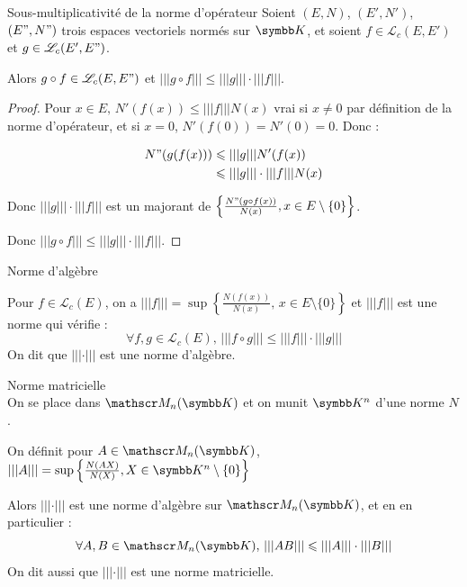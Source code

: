 \begin{proposition}{Sous-multiplicativité de la norme d'opérateur}{}
    Soient $(E, N)$, $(E', N')$, $(E", N")$ trois espaces vectoriels normés sur $\K$, et soient $f \in \mathscr L_c(E, E')$ et $g \in \mathscr L_c(E', E")$.

    \begin{center}
    Alors $g \circ f \in \mathscr L_c(E, E")$ et $|||g \circ f||| \leqslant |||g||| \cdot |||f|||$.
    \end{center}
\end{proposition}

\begin{proof}
    Pour $x \in E, \, N'(f(x)) \leqslant |||f||| N(x)$ vrai si $x \neq 0$ par définition 
    de la norme d'opérateur, et si $x = 0$, $N'(f(0)) = N'(0) = 0$.
    Donc :

    \begin{align*}
        N"(g(f(x))) & \leqslant |||g||| N'(f(x)) \\
        & \leqslant |||g||| \cdot |||f||| N(x)
    \end{align*}

    Donc $|||g||| \cdot |||f|||$ est un majorant de $\left\{ \frac{N"(g\circ f(x))}{N(x)}, x \in E \setminus \{0\} \right\}$.

    Donc $|||g \circ f||| \leqslant |||g||| \cdot |||f|||$.
\end{proof}

\begin{proposition}{Norme d'algèbre}{}

    Pour $f \in \mathscr L_c(E)$, on a $|||f||| = \sup \left\{ \frac{N(f(x))}{N(x)}, \, x \in E \setminus \{0\} \right\}$
    et $|||f|||$ est une norme qui vérifie : 
    \[\forall f, g \in \mathscr L_c(E), \, |||f \circ g||| \leqslant |||f||| \cdot |||g|||\]
    On dit que $|||\cdot|||$ est une norme d'algèbre. 
\end{proposition}

\begin{proposition}{Norme matricielle}{}
    \\On se place dans $\mathscr M_n(\K)$ et on munit $\K^n$ d'une norme $N$.

    On définit pour $A \in \mathscr M_n(\K)$, $|||A||| = \sup \left\{ \frac{N(AX)}{N(X)}, X \in \K^n \setminus \{0\} \right\}$
    
    Alors $|||\cdot|||$ est une norme d'algèbre sur $\mathscr M_n(\K)$, et en en particulier : 
    \[\forall A, B \in \mathscr M_n(\K), \, |||AB||| \leqslant |||A||| \cdot |||B|||\]
    On dit aussi que $|||\cdot|||$ est une norme matricielle. 
\end{proposition}

